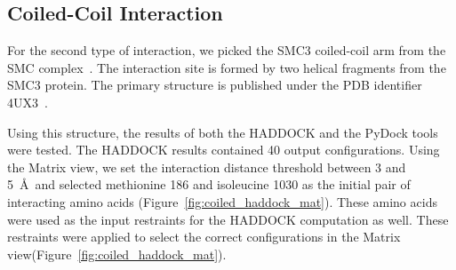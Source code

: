 \documentclass{bmcart}
\def\MatView {Matrix view\xspace}
\begin{document}




\subsection*{Coiled-Coil Interaction}
For the second type of interaction, we picked the SMC3 coiled-coil arm from the SMC complex~\cite{Gligoris}.
The interaction site is formed by two helical fragments from the SMC3 protein.
The primary structure is published under the PDB identifier 4UX3~\cite{pmid25414305}.  

Using this structure, the results of both the HADDOCK and the PyDock tools were tested.
The HADDOCK results contained 40 output configurations.
Using the \MatView, we set the interaction distance threshold between 3 and 5~\AA~and selected methionine 186 and isoleucine 1030 as the initial pair of interacting amino acids (Figure~\ref{fig:coiled_haddock_mat}). 
These amino acids were used as the input restraints for the HADDOCK computation as well.
These restraints were applied to select the correct configurations in the \MatView (Figure~\ref{fig:coiled_haddock_mat}).
\end{document}

